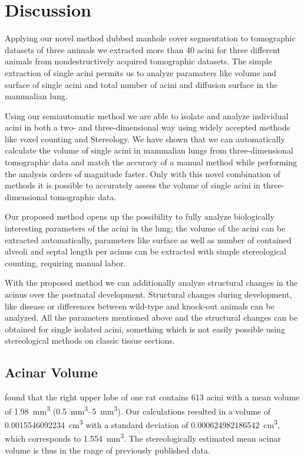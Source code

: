 \documentclass[twoside,paper=a4,abstract=true,english,DIVcalc]{scrartcl}
\newcommand{\volume}{0.0015546092234} %
\newcommand{\std}{0.000624982186542} %
\begin{document}
\section{Discussion}
Applying our novel method dubbed manhole cover segmentation to tomographic datasets of three animals we extracted more than 40 acini for three different animals from nondestructively acquired tomographic datasets. The simple extraction of single acini permits us to analyze paramaters like volume and surface of single acini and total number of acini and diffusion surface in the mammalian lung.

Using our semiautomatic method we are able to isolate and analyze individual acini in both a two- and three-dimensional way using widely accepted methods like voxel counting and Stereology. We have shown that we can automatically calculate the volume of single acini in mammalian lungs from three-dimensional tomographic data and match the accuracy of a manual method while performing the analysis orders of magnitude faster. Only with this novel combination of methods it is possible to accurately assess the volume of single acini in three-dimensional tomographic data.

Our proposed method opens up the possibility to fully analyze biologically interesting parameters of the acini in the lung; the volume of the acini can be extracted automatically, parameters like surface as well as number of contained alveoli and septal length per acinus can be extracted with simple stereological counting, requiring manual labor.

With the proposed method we can additionally analyze structural changes in the acinus over the postnatal development. Structural changes during development, like disease or differences between wild-type and knock-out animals can be analyzed. All the parameters mentioned above and the structural changes can be obtained for single isolated acini, something which is not easily possible using stereological methods on classic tissue sections.

\subsection{Acinar Volume}
\citet[Table 1]{Rodriguez1987} found that the right upper lobe of one rat contains 613 acini with a mean volume of \SI{1.98}{\milli\meter\cubed} (\SIrange{0.5}{5}{\milli\meter\cubed}). Our calculations resulted in a volume of \SI{\volume}{\cubic\centi\meter} with a standard deviation of \SI{\std}{\cubic\centi\meter}, which corresponds to \SI{1.554}{\cubic\milli\meter}. The stereologically estimated mean acinar volume is thus in the range of previously published data.
\end{document}
